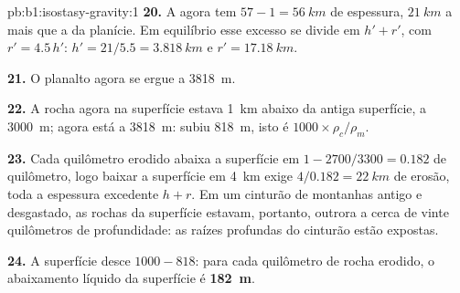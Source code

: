 \begin{solution}{pb:b1:isostasy-gravity:1}
\textbf{20.} A  agora tem $57 - 1 = \qty{56}{km}$ de espessura, $\qty{21}{km}$ a mais
que a da planície. Em equilíbrio esse excesso se divide em $h' + r'$, com
$r' = 4.5\,h'$: $h' = 21/5.5 = \qty{3.818}{km}$ e $r' = \qty{17.18}{km}$.

\textbf{21.} O planalto agora se ergue a \qty{3818}{m}.

\textbf{22.} A rocha agora na superfície estava \qty{1}{km} abaixo da antiga superfície,
a \qty{3000}{m}; agora está a \qty{3818}{m}: subiu \qty{818}{m},
isto é $1000\times\rho_c/\rho_m$.

\textbf{23.} Cada quilômetro erodido abaixa a superfície em $1 - 2700/3300 =
0.182$ de quilômetro, logo baixar a superfície em \qty{4}{km} exige
$4/0.182 = \qty{22}{km}$ de erosão, toda a espessura excedente $h + r$. Em um
cinturão de montanhas antigo e desgastado, as rochas da superfície estavam, portanto, outrora a cerca de
vinte quilômetros de profundidade: as raízes profundas do cinturão estão expostas.

\textbf{24.} A superfície desce $1000 - 818$: para cada quilômetro de rocha
erodido, o abaixamento líquido da superfície é
\textbf{\qty[text-series-to-math=true]{182}{m}}.
\end{solution}
